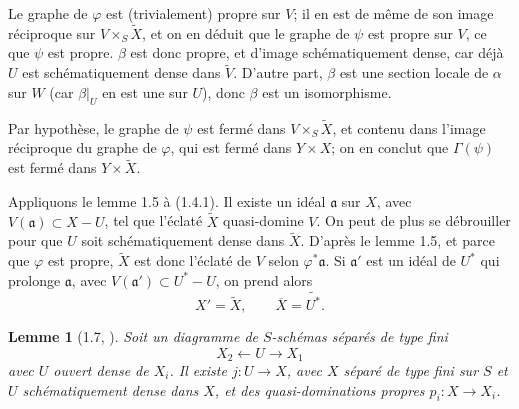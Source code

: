 \documentclass[10pt,a4paper]{article}
\theoremstyle{deligne}
\newtheorem*{lemma*}{Lemme}
\begin{document}
Le graphe de \(\varphi\) est (trivialement) propre sur \(V\); il en est de même de son image réciproque sur \(V\times_S\widetilde X\), et on en déduit que le graphe de \(\psi\) est propre sur \(V\), ce que \(\psi\) est propre. \(\beta\) est donc propre, et d'image schématiquement dense, car déjà \(U\) est schématiquement dense dans \(\widetilde V\). D'autre part, \(\beta\) est une section locale de \(\alpha\) sur \(W\) (car \(\beta|_U\) en est une sur \(U\)), donc \(\beta\) est un isomorphisme.

Par hypothèse, le graphe de \(\psi\) est fermé dans \(V\times_S\widetilde X\), et contenu dans l'image réciproque du graphe de \(\varphi\), qui est fermé dans \(Y\times X\); on en conclut que \(\Gamma(\psi)\) est fermé dans \(Y\times \widetilde X\).

Appliquons le lemme 1.5 à (1.4.1). Il existe un idéal \(\mathfrak a\) sur \(X\), avec \(V(\mathfrak a)\subset X-U\), tel que l'éclaté \(\widetilde X\) quasi-domine \(V\). On peut de plus se débrouiller pour que \(U\) soit schématiquement dense dans \(\widetilde X\). D'après le lemme 1.5, et parce que \(\varphi\) est propre, \(\widetilde X\) est donc l'éclaté de \(V\) selon \(\varphi^*\mathfrak a\). Si \(\mathfrak a'\) est un idéal de \(U^*\) qui prolonge \(\mathfrak a\), avec \(V(\mathfrak a')\subset U^*-U\), on prend alors
\[
X'=\widetilde X,
\qquad
\overline X=\widetilde{U^*}.
\]

\begin{lemma*}[1.7, {\normalfont [2, lemme 4.2]}]
Soit un diagramme de \(S\)-schémas séparés de type fini
\[
X_2\xleftarrow{} U \xrightarrow{} X_1
\]
avec \(U\) ouvert dense de \(X_i\). Il existe \(j:U\to X\), avec \(X\) séparé de type fini sur \(S\) et \(U\) schématiquement dense dans \(X\), et des quasi-dominations propres \(p_i:X\to X_i\).
\end{lemma*}
\end{document}
